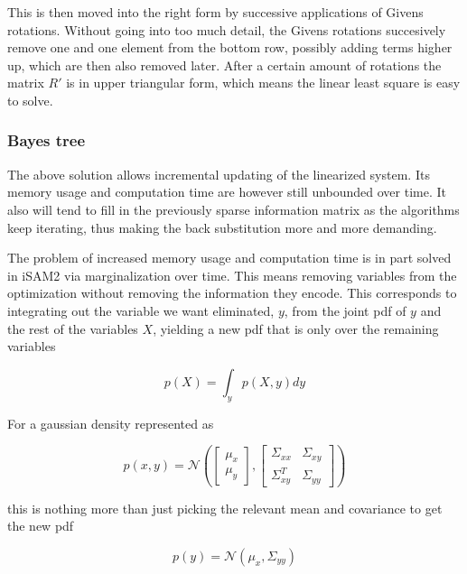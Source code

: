 This is then moved into the right form by successive applications of Givens rotations\cite{GivensRot}. Without going into too much detail, the Givens rotations succesively remove one and one element from the bottom row, possibly adding terms higher up, which are then also removed later. After a certain amount of rotations the matrix $R'$ is in upper triangular form, which means the linear least square is easy to solve.

\subsubsection{Bayes tree}

The above solution allows incremental updating of the linearized system. Its memory usage and computation time are however still unbounded over time. It also will tend to fill in the previously sparse information matrix as the algorithms keep iterating, thus making the back substitution more and more demanding.

The problem of increased memory usage and computation time is in part solved in iSAM2 via marginalization over time. This means removing variables from the optimization without removing the information they encode. This corresponds to integrating out the variable we want eliminated, $y$, from the joint pdf of $y$ and the rest of the variables $X$, yielding a new pdf that is only over the remaining variables

\begin{equation}
    p(X) = \int_yp(X,y)dy
\end{equation}

For a gaussian density represented as 

\begin{equation}
    p(x,y) = \mathcal{N}(\begin{bmatrix}\mu_x \\ \mu_y \end{bmatrix}, \begin{bmatrix} \Sigma_{xx} & \Sigma_{xy} \\ \Sigma_{xy}^T & \Sigma_{yy} \end{bmatrix}) 
\end{equation}

this is nothing more than just picking the relevant mean and covariance to get the new pdf

\begin{equation}
    p(y) = \mathcal{N}(\mu_x,\Sigma_{yy})
\end{equation}

